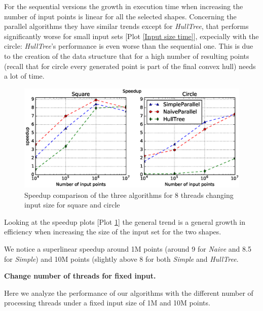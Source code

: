 \documentclass[letterpaper]{article}
\newcommand{\mypar}[1]{{\bf #1.}}
\begin{document}
For the sequential versions the growth in execution time when increasing the number of input points is linear for all the selected shapes.
Concerning the parallel algorithms they have similar trends except for \textit{HullTree}, that performs significantly worse for small input sets [Plot \ref{Input size time}], expecially with the circle: \textit{HullTree}'s performance is even worse than the sequential one.
This is due to the creation of the data structure that for a high number of resulting points (recall that for circle every generated point is part of the final convex hull) needs a lot of time.

\begin{figure}[!ht]\centering
  \includegraphics[scale=0.33]{./plots/speedup_points.eps}
  \caption{Speedup comparison of the three algorithms for 8 threads changing input size for square and circle\label{Input size speedup}}
\end{figure}

Looking at the speedup plots [Plot \ref{Input size speedup}] the general trend is a general growth in efficiency when increasing the size of the input set for the two shapes.

We notice a superlinear speedup around 1M points (around 9 for \textit{Naive} and 8.5 for \textit{Simple}) and 10M points (slightly above 8 for both \textit{Simple} and \textit{HullTree}.

\mypar{Change number of threads for fixed input}

Here we analyze the performance of our algorithms with the different number of processing threads under a fixed input size of 1M and 10M points.
\end{document}
